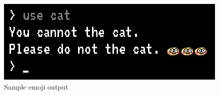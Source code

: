 \documentclass{article}
\begin{document}
    \captionsetup{justification=centering,margin=3cm}
    \begin{figure}
        \centering
        \includegraphics[width=\textwidth]{images/emoji.jpg}
        \caption{Sample emoji output} \label{fig:emoji}
    \end{figure}
%         
\end{document}
